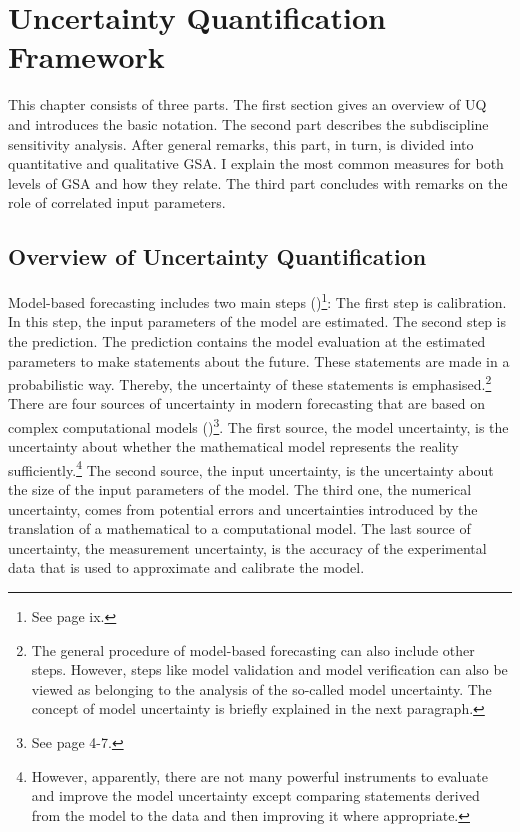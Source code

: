 \documentclass[a4paper,12pt]{article}
\begin{document}
\newpage %

\section{Uncertainty Quantification Framework}
\thispagestyle{plain} %

This chapter consists of three parts. The first section gives an overview of UQ and introduces the basic notation. The second part describes the subdiscipline sensitivity analysis. After general remarks, this part, in turn, is divided into quantitative and qualitative GSA. I explain the most common measures for both levels of GSA and how they relate. The third part concludes with remarks on the role of correlated input parameters.

\subsection{Overview of Uncertainty Quantification}
Model-based forecasting includes two main steps (\cite{Smith.2014})\footnote{See page ix.}: The first step is calibration. In this step, the input parameters of the model are estimated. The second step is the prediction. The prediction contains the model evaluation at the estimated parameters to make statements about the future. These statements are made in a probabilistic way. Thereby, the uncertainty of these statements is emphasised.\footnote{The general procedure of model-based forecasting can also include other steps. However, steps like model validation and model verification can also be viewed as belonging to the analysis of the so-called model uncertainty. The concept of model uncertainty is briefly explained in the next paragraph.}\\
\newline
There are four sources of uncertainty in modern forecasting that are based on complex computational models (\cite{Smith.2014})\footnote{See page 4-7.}. The first source, the model uncertainty, is the uncertainty about whether the mathematical model represents the reality sufficiently.\footnote{However, apparently, there are not many powerful instruments to evaluate and improve the model uncertainty except comparing statements derived from the model to the data and then improving it where appropriate.} The second source, the input uncertainty, is the uncertainty about the size of the input parameters of the model. The third one, the numerical uncertainty, comes from potential errors and uncertainties introduced by the translation of a mathematical to a computational model. The last source of uncertainty, the measurement uncertainty, is the accuracy of the experimental data that is used to approximate and calibrate the model.
\end{document}
